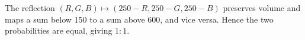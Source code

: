 The reflection $(R,G,B)\mapsto(250-R,250-G,250-B)$ preserves volume and maps a sum below 150 to a sum above 600, and vice versa. Hence the two probabilities are equal, giving $\boxed{1:1}$.
